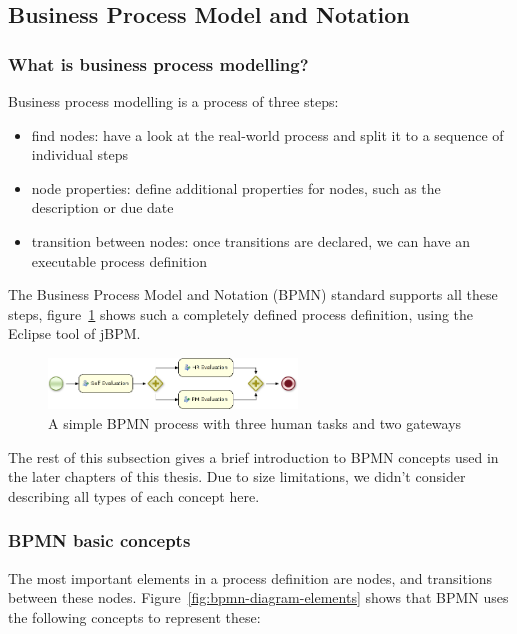 \subsection{Business Process Model and Notation}

\subsubsection*{What is business process modelling?}

Business process modelling is a process of three steps:

\begin{itemize}
\item find nodes: have a look at the real-world process and split it to a sequence of individual steps
\item node properties: define additional properties for nodes, such as the description or due date
\item transition between nodes: once transitions are declared, we can have an executable process definition
\end{itemize}

The Business Process Model and Notation (BPMN) standard\cite{bpmn} supports all
these steps, figure~\ref{fig:bpmn-sample} shows such a completely defined
process definition, using the Eclipse tool of jBPM.

\begin{figure}[H]
\centering
\includegraphics[width=250px,keepaspectratio]{bpmn-sample.png}
\caption{A simple BPMN process with three human tasks and two gateways}
\label{fig:bpmn-sample}
\end{figure}

The rest of this subsection gives a brief introduction to BPMN concepts used in
the later chapters of this thesis. Due to size limitations, we didn't consider
describing all types of each concept here.

\subsubsection*{BPMN basic concepts}

The most important elements in a process definition are nodes, and transitions
between these nodes. Figure~\ref{fig:bpmn-diagram-elements} shows that BPMN
uses the following concepts to represent these:

